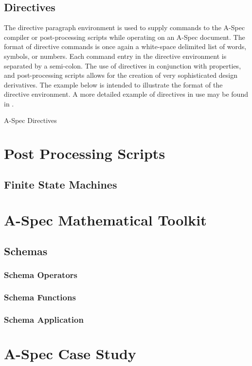 \documentclass[letterpaper,10pt,draft]{book}
\begin{document}
\section{Directives}
   \label{sect:Directives}

The directive paragraph environment is used to supply commands to the A-Spec compiler
or post-processing scripts while operating on an A-Spec document.  The format of
directive commands is once again a white-space delimited list of words, symbols,
or numbers.  Each command entry in the directive environment is separated by a semi-colon.
The use of directives in conjunction with properties, and post-processing scripts
allows for the creation of very sophisticated design derivatives.  The example below
is intended to illustrate the format of the directive environment.  A more detailed
example of directives in use may be found in .

\begin{example}
   

   \caption{A-Spec Directives}
   \label{ex:Direc}
\end{example}

\chapter{Post Processing Scripts}
   \label{ch:Scripts}

\section{Finite State Machines}
   \label{sect:FSM}

\chapter{A-Spec Mathematical Toolkit}
   \label{ch:Toolkit}

\section{Schemas}
   \label{sect:TKSchema}

\subsection{Schema Operators}
   \label{sect:TKSchOp}

\subsection{Schema Functions}
   \label{sect:TKSchFunc}

\subsection{Schema Application}
   \label{sect:TKSchAppl}

\chapter{A-Spec Case Study}
   \label{ch:CaseStudy}
\end{document}
